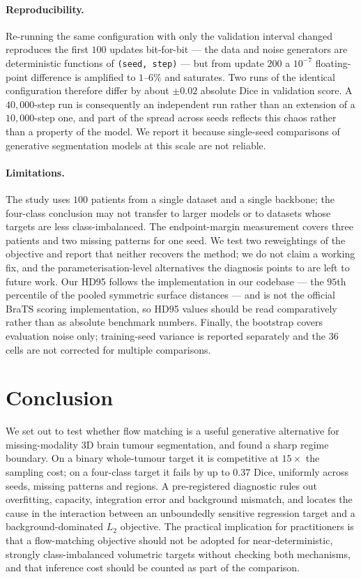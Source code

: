 \documentclass[conference]{IEEEtran}
\begin{document}
\paragraph{Reproducibility.}
Re-running the same configuration with only the validation interval changed
reproduces the first $100$ updates bit-for-bit --- the data and noise generators
are deterministic functions of \texttt{(seed, step)} --- but from update $200$
a $10^{-7}$ floating-point difference is amplified to $1$--$6\%$ and saturates.
Two runs of the identical configuration therefore differ by about $\pm 0.02$
absolute Dice in validation score. A $40{,}000$-step run is consequently an
independent run rather than an extension of a $10{,}000$-step one, and part of
the spread across seeds reflects this chaos rather than a property of the model.
We report it because single-seed comparisons of generative segmentation models
at this scale are not reliable.

\paragraph{Limitations.}
The study uses $100$ patients from a single dataset and a single backbone; the
four-class conclusion may not transfer to larger models or to datasets whose
targets are less class-imbalanced. The endpoint-margin measurement covers three
patients and two missing patterns for one seed. We test two reweightings of the
objective and report that neither recovers the method; we do not claim a working
fix, and the parameterisation-level alternatives the diagnosis points to are
left to future work. Our
HD95 follows the implementation in our codebase --- the $95$th percentile of the
pooled symmetric surface distances --- and is not the official BraTS scoring
implementation, so HD95 values should be read comparatively rather than as
absolute benchmark numbers. Finally, the bootstrap covers evaluation noise only;
training-seed variance is reported separately and the $36$ cells are not
corrected for multiple comparisons.

\section{Conclusion}

We set out to test whether flow matching is a useful generative alternative for
missing-modality 3D brain tumour segmentation, and found a sharp regime
boundary. On a binary whole-tumour target it is competitive at $15\times$ the
sampling cost; on a four-class target it fails by up to $0.37$ Dice, uniformly
across seeds, missing patterns and regions. A pre-registered diagnostic rules
out overfitting, capacity, integration error and background mismatch, and
locates the cause in the interaction between an unboundedly sensitive regression
target and a background-dominated $L_2$ objective. The practical implication for
practitioners is that a flow-matching objective should not be adopted for
near-deterministic, strongly class-imbalanced volumetric targets without
checking both mechanisms, and that inference cost should be counted as part of
the comparison.

\REMEDYCONCLUSION



\end{document}
